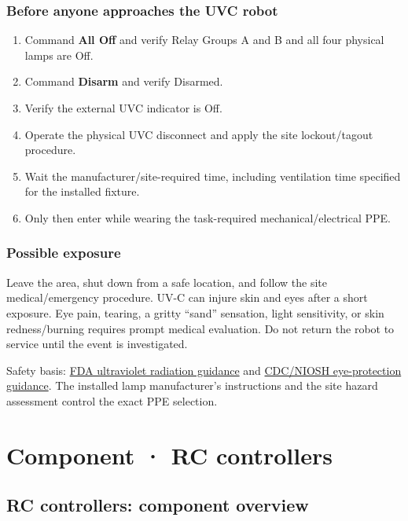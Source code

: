 \documentclass[
  10pt,
  letterpaper,
  openany]{report}
\providecommand{\tightlist}{%
  \setlength{\itemsep}{0pt}\setlength{\parskip}{0pt}}
\begin{document}
\subsection{Before anyone approaches the UVC
robot}\label{before-anyone-approaches-the-uvc-robot}

\begin{enumerate}
\tightlist
\item
  Command \textbf{All Off} and verify Relay Groups A and B and all four
  physical lamps are Off.
\item
  Command \textbf{Disarm} and verify Disarmed.
\item
  Verify the external UVC indicator is Off.
\item
  Operate the physical UVC disconnect and apply the site lockout/tagout
  procedure.
\item
  Wait the manufacturer/site-required time, including ventilation time
  specified for the installed fixture.
\item
  Only then enter while wearing the task-required mechanical/electrical
  PPE.
\end{enumerate}

\subsection{Possible exposure}\label{possible-exposure}

Leave the area, shut down from a safe location, and follow the site
medical/emergency procedure. UV-C can injure skin and eyes after a short
exposure. Eye pain, tearing, a gritty ``sand'' sensation, light
sensitivity, or skin redness/burning requires prompt medical evaluation.
Do not return the robot to service until the event is investigated.

Safety basis:
\href{https://www.fda.gov/radiation-emitting-products/tanning/ultraviolet-uv-radiation}{FDA
ultraviolet radiation guidance} and
\href{https://www.cdc.gov/niosh/ppe/eye-safety/index.html}{CDC/NIOSH
eye-protection guidance}. The installed lamp manufacturer's instructions
and the site hazard assessment control the exact PPE selection.

\chapter{Component · RC controllers}\label{component-rc-controllers}

\protect{}\label{controllers}
\section{RC controllers: component
overview}\label{rc-controllers-component-overview}
\end{document}
